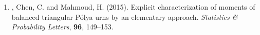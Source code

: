 \begin{enumerate}[series=journalpubs]

\item\begin{cventry} \PZ{}, Chen, C. and Mahmoud, H. (2015). Explicit characterization of moments of balanced triangular P\'{o}lya urns by an elementary approach. \emph{Statistics \& Probability Letters}, \textbf{96}, 149--153.
\par\end{cventry}
\end{enumerate}
